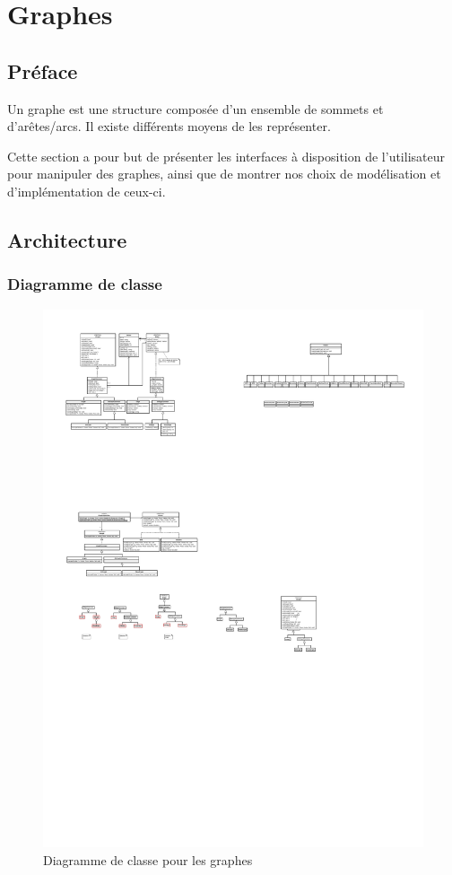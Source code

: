\documentclass[french]{article}
\begin{document}
	\section{Graphes}
	\label{sec:graphes}
		\subsection{Préface}
		Un graphe est une structure composée d'un ensemble de sommets et d'arêtes/arcs. Il existe différents moyens de les représenter.
		
		Cette section a pour but de présenter les interfaces à disposition de l'utilisateur pour manipuler des graphes, ainsi que de montrer nos choix de modélisation et d'implémentation de ceux-ci.
		
		\subsection{Architecture}
		
			\subsubsection{Diagramme de classe}
			\begin{figure}[H]
				\centering
				\includegraphics[scale=2.8]{Conception/graph/umlGraph.pdf}
				\caption{Diagramme de classe pour les graphes}
			\end{figure}
		
\end{document}
